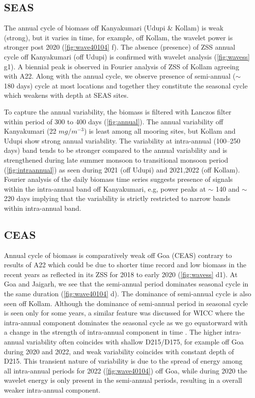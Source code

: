 \documentclass{article}
\begin{document}
	\subsection{SEAS}
    The annual cycle of biomass off Kanyakumari (Udupi \& Kollam) is weak (strong), but it varies in time, for example, off Kollam, the wavelet power is stronger post 2020 (\cref{fig:wave40104} f). The absence (presence) of ZSS annual cycle off Kanyakumari (off Udupi) is confirmed with wavelet analysis (\cref{fig:wavess} g1). A biennial peak is observed in Fourier analysis of ZSS of Kollam agreeing with A22.  Along with the annual cycle, we observe presence of semi-annual ($\sim$ 180 days) cycle at most locations and together they constitute the seasonal cycle which weakens with depth at SEAS sites.

	To capture the annual variability, the biomass is filtered with Lanczos filter within period of 300 to 400 days (\cref{fig:annual}). The annual variability off Kanyakumari (22 $mg / m^{-3}$) is least among all mooring sites, but Kollam and Udupi show strong annual variability. The variability at intra-annual (100--250 days) band tends to be stronger compared to the annual variability and is strengthened during late summer monsoon to transitional monsoon period (\cref{fig:intraannual}) as seen during 2021 (off Udupi) and 2021,2022 (off Kollam). Fourier analysis of the daily biomass time series suggests presence of signals within the intra-annual band off Kanyakumari, e.g, power peaks at $\sim$ 140 and $\sim$ 220 days implying that the variability is strictly restricted to narrow bands within intra-annual band. 
	
	\subsection{CEAS}
	Annual cycle of biomass is comparatively weak off Goa (CEAS) contrary to results of A22 which could be due to shorter time record and low biomass in the recent years as reflected in its ZSS for 2018 to early 2020 (\cref{fig:wavess} d1). At Goa and Jaigarh, we see that the semi-annual period dominates seasonal cycle in the same duration (\cref{fig:wave40104} d). The dominance of semi-annual cycle is also seen off Kollam. Although the dominance of semi-annual period in seasonal cycle is seen only for some years, a similar feature was discussed for WICC where the intra-annual component dominates the seasonal cycle as we go equatorward with a change in the strength of intra-annual component in time \citep{chaudhuri2020observed}. The higher intra-annual variability often coincides with shallow D215/D175, for example off Goa during 2020 and 2022, and weak variability coincides with constant depth of D215. This transient nature of variability is due to the spread of energy among all intra-annual periods for 2022 (\cref{fig:wave40104}) off Goa, while during 2020 the wavelet energy is only present in the semi-annual periods, resulting in a overall weaker intra-annual component.
	
\end{document}
